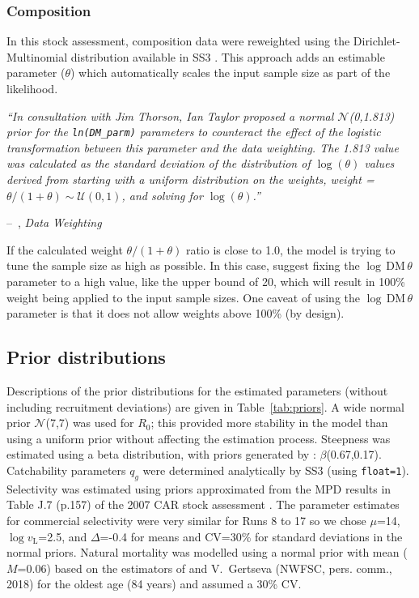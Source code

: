 \documentclass[11pt]{book}
\makeatletter
\newcommand{\Norm}{\mathcal{N}}%
\newcommand{\pc}{\%}
\newenvironment{chapquote}[2][2em]
  {\setlength{\@tempdima}{#1}%
   \def\chapquote@author{#2}%
   \parshape 1 \@tempdima \dimexpr\textwidth-2\@tempdima\relax%
   \itshape}
  {\par\normalfont\hfill--\ \chapquote@author\hspace*{\@tempdima}\par\smallskip}
\newcommand{\code}[1]{\normalsize\texttt{#1}\normalsize}%
\makeatother
\begin{document}
\subsubsection{Composition} \label{sss:rwt_abund}

In this stock assessment, composition data were reweighted using the Dirichlet-Multinomial distribution available in SS3 \citep{Thorson-etal:2017}. 
This approach adds an estimable parameter ($\theta$) which automatically scales the input sample size as part of the likelihood.

\begin{chapquote}{\citet{Methot-etal:2021}, \textit{Data Weighting}}
``In consultation with Jim Thorson, Ian Taylor proposed a normal $\Norm$(0,1.813) prior for
the \texttt{ln(DM\_parm)} parameters to counteract the effect of the logistic 
transformation between this parameter and the data weighting. The 1.813 value was
calculated as the standard deviation of the distribution of $\log(\theta)$ values derived from
starting with a uniform distribution on the weights, weight = $\theta/(1 + \theta) \sim \mathcal{U}(0,1)$,
and solving for $\log(\theta)$.''

\end{chapquote}

If the calculated weight $\theta/(1 + \theta)$ ratio is close to 1.0, the model is trying to tune the sample size as high as possible.
In this case, \citet{Methot-etal:2021} suggest fixing the $\log\,\text{DM}\,\theta$ parameter to a high value, like the upper bound of 20, which will result in 100\pc{} weight being applied to the input sample sizes.
One caveat of using the $\log\,\text{DM}\,\theta$ parameter is that it does not allow weights above 100\pc{} (by design).

\subsection{Prior distributions}

Descriptions of the prior distributions for the estimated parameters (without including recruitment deviations) are given in Table~\ref{tab:priors}.
A wide normal prior $\Norm$(7,7) was used for $R_0$; this provided more stability in the model than using a uniform prior without affecting the estimation process.
Steepness was estimated using a beta distribution, with priors generated by \citet{Forrest-etal:2010}: $\beta$(0.67,0.17).
Catchability parameters $q_g$ were determined analytically by SS3 (using \code{float=1}).
Selectivity was estimated using priors approximated from the MPD results in Table J.7 (p.157) of the 2007 CAR stock assessment \citep{Stanley-etal:2009_car}.
The parameter estimates for commercial selectivity were very similar for Runs 8 to 17 so we chose $\mu$=14, $\log v_\text{L}$=2.5, and $\Delta$=-0.4 for means and CV=30\pc{} for standard deviations in the normal priors.
Natural mortality was modelled using a normal prior with mean ($M$=0.06) based on the estimators of \citet{Hoenig:1983} and V.~Gertseva (NWFSC, pers. comm., 2018) for the oldest age (84 years) and assumed a 30\pc{} CV.
\end{document}
